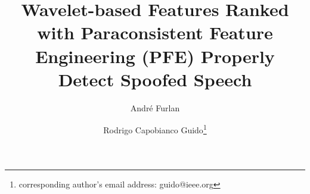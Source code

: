 	\begin{frontmatter}
		\vspace*{-40pt}
		\title{Wavelet-based Features Ranked with Paraconsistent Feature Engineering (PFE) Properly Detect Spoofed Speech}
		\author[a1,a2]{Andr\'{e} Furlan}
		\author[a1]{Rodrigo Capobianco Guido\footnote{corresponding author's email address: guido@ieee.org}}
		\address[a1]{Instituto de Bioci\^{e}ncias, Letras e Ci\^{e}ncias Exatas, Unesp - Univ Estadual Paulista (S\~{a}o Paulo State University), Rua Crist\'{o}v\~{a}o Colombo 2265, Jd Nazareth, 15054-000, S\~{a}o Jos\'{e} do Rio Preto - SP, Brazil.}
		\address[a2]{Centro Paula Souza, S\~{a}o Paulo, SP, Brazil.}
		\begin{abstract} 
			
		\end{abstract}
		\begin{keyword}
			
		\end{keyword}
	\end{frontmatter}